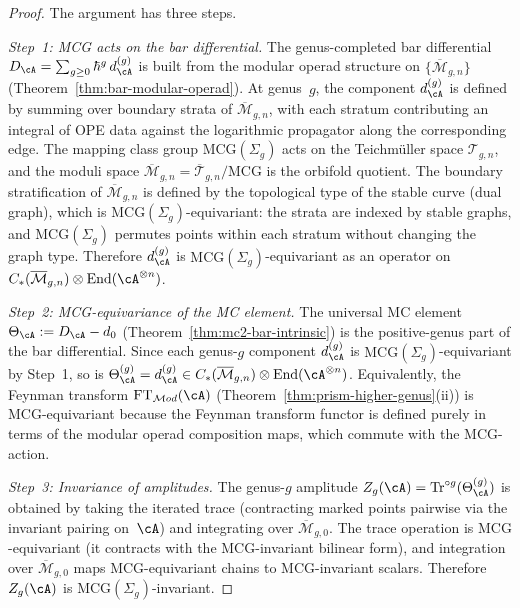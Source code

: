 \begin{proof}
The argument has three steps.

\emph{Step~1: MCG acts on the bar differential.}
The genus-completed bar differential
$D_\cA = \sum_{g \geq 0} \hbar^g\, d_\cA^{(g)}$
is built from the modular operad structure on
$\{\overline{\mathcal{M}}_{g,n}\}$
(Theorem~\ref{thm:bar-modular-operad}).
At genus~$g$, the component $d_\cA^{(g)}$ is defined by
summing over boundary strata of
$\overline{\mathcal{M}}_{g,n}$, with each stratum
contributing an integral of OPE data against the
logarithmic propagator along the corresponding edge.
The mapping class group
$\mathrm{MCG}(\Sigma_g)$ acts on the Teichm\"uller space
$\mathcal{T}_{g,n}$, and the moduli space
$\overline{\mathcal{M}}_{g,n} = \overline{\mathcal{T}}_{g,n}
/ \mathrm{MCG}$ is the orbifold quotient.
The boundary stratification of
$\overline{\mathcal{M}}_{g,n}$ is defined by the
topological type of the stable curve (dual graph), which is
$\mathrm{MCG}(\Sigma_g)$-equivariant: the strata are
indexed by stable graphs, and $\mathrm{MCG}(\Sigma_g)$
permutes points within each stratum without changing the
graph type.  Therefore $d_\cA^{(g)}$ is
$\mathrm{MCG}(\Sigma_g)$-equivariant as an operator on
$C_*(\overline{\mathcal{M}}_{g,n}) \otimes
\operatorname{End}(\cA^{\otimes n})$.

\emph{Step~2: MCG-equivariance of the MC element.}
The universal MC element $\Theta_\cA := D_\cA - d_0$
(Theorem~\ref{thm:mc2-bar-intrinsic}) is the positive-genus
part of the bar differential.  Since each genus-$g$ component
$d_\cA^{(g)}$ is $\mathrm{MCG}(\Sigma_g)$-equivariant by
Step~1, so is
$\Theta_\cA^{(g)} = d_\cA^{(g)} \in
C_*(\overline{\mathcal{M}}_{g,n}) \otimes
\operatorname{End}(\cA^{\otimes n})$.
Equivalently, the Feynman transform
$\mathrm{FT}_{\mathcal{M}od}(\cA)$
(Theorem~\ref{thm:prism-higher-genus}(ii)) is
$\mathrm{MCG}$-equivariant because the Feynman transform
functor is defined purely in terms of the modular operad
composition maps, which commute with the
$\mathrm{MCG}$-action.

\emph{Step~3: Invariance of amplitudes.}
The genus-$g$ amplitude $Z_g(\cA) =
\operatorname{Tr}^{\circ g}(\Theta_\cA^{(g)})$ is obtained
by taking the iterated trace (contracting marked points
pairwise via the invariant pairing on~$\cA$) and integrating
over $\overline{\mathcal{M}}_{g,0}$.  The trace operation is
$\mathrm{MCG}$-equivariant (it contracts with the
$\mathrm{MCG}$-invariant bilinear form), and integration
over $\overline{\mathcal{M}}_{g,0}$ maps
$\mathrm{MCG}$-equivariant chains to
$\mathrm{MCG}$-invariant scalars.  Therefore $Z_g(\cA)$ is
$\mathrm{MCG}(\Sigma_g)$-invariant.
\end{proof}

